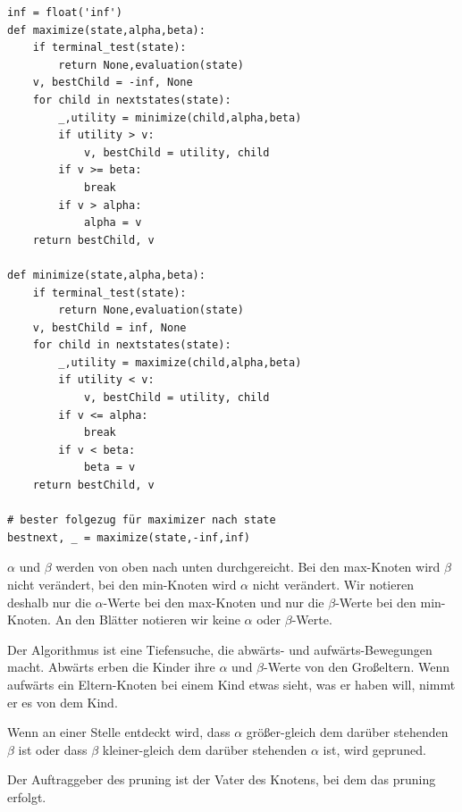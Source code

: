 \begin{frame}[fragile]
\begin{minipage}[t]{7.5cm}
\begin{lstlisting}[basicstyle=\tiny]
inf = float('inf')
def maximize(state,alpha,beta):
    if terminal_test(state):
        return None,evaluation(state)
    v, bestChild = -inf, None
    for child in nextstates(state):
        _,utility = minimize(child,alpha,beta)
        if utility > v:
            v, bestChild = utility, child
        if v >= beta:
            break
        if v > alpha:
            alpha = v
    return bestChild, v

def minimize(state,alpha,beta):
    if terminal_test(state):
        return None,evaluation(state)
    v, bestChild = inf, None
    for child in nextstates(state):
        _,utility = maximize(child,alpha,beta)
        if utility < v:
            v, bestChild = utility, child
        if v <= alpha:
            break
        if v < beta:
            beta = v
    return bestChild, v 

# bester folgezug für maximizer nach state
bestnext, _ = maximize(state,-inf,inf)
\end{lstlisting} \pause
\end{minipage} 
\end{frame}

\begin{frame}[fragile]

$\alpha$ und $\beta$ werden von oben nach unten durchgereicht. Bei den max-Knoten wird $\beta$ nicht verändert, bei den min-Knoten wird $\alpha$ nicht verändert. Wir notieren deshalb nur die $\alpha$-Werte bei den max-Knoten und nur die $\beta$-Werte bei den min-Knoten. An den Blätter notieren wir keine $\alpha$ oder $\beta$-Werte.

Der Algorithmus ist eine Tiefensuche, die abwärts- und aufwärts-Bewegungen macht. Abwärts erben die Kinder ihre  $\alpha$ und $\beta$-Werte von den Großeltern. Wenn aufwärts ein Eltern-Knoten bei einem Kind etwas sieht, was er haben will, nimmt er es von dem Kind.

Wenn an einer Stelle entdeckt wird, dass $\alpha$ größer-gleich dem darüber stehenden $\beta$ ist oder
dass $\beta$ kleiner-gleich dem darüber stehenden  $\alpha$ ist, wird gepruned.

Der Auftraggeber des pruning ist der Vater des Knotens, bei dem das pruning erfolgt.
\end{frame}

